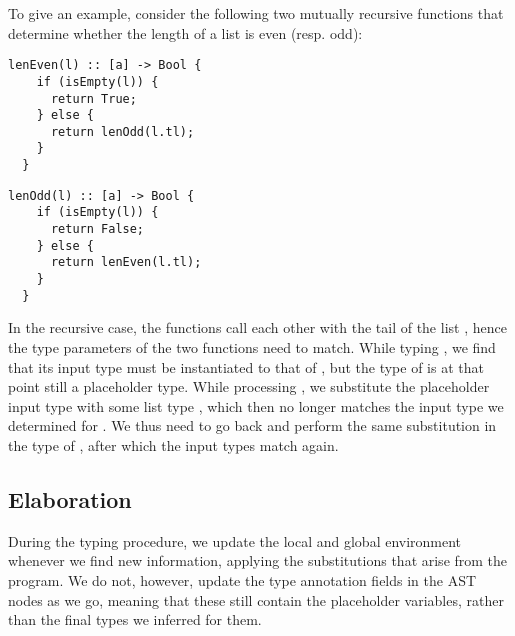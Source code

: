 To give an example, consider the following two mutually recursive functions that
determine whether the length of a list is even (resp. odd):

\begin{center}
\begin{minipage}{.4\textwidth}
  \centering
\begin{lstlisting}[language=SPL]
  lenEven(l) :: [a] -> Bool {
    if (isEmpty(l)) {
      return True;
    } else {
      return lenOdd(l.tl);
    }
  }
\end{lstlisting}
\end{minipage}\hspace{8mm}%
\begin{minipage}{.4\textwidth}
  \centering
\begin{lstlisting}[language=SPL]
  lenOdd(l) :: [a] -> Bool {
    if (isEmpty(l)) {
      return False;
    } else {
      return lenEven(l.tl);
    }
  }
\end{lstlisting}
\end{minipage}
\end{center}\vspace{2mm}

In the recursive case, the functions call each other with the tail of the list
, hence the type parameters of the two functions need to match.
While typing , we find that its input type must be instantiated to
that of , but the type of  is at that point still a
placeholder type.
While processing , we substitute the placeholder input type with
some list type \spl{[$\alpha$]}, which then no longer matches the input type we
determined for . We thus need to go back and perform the same
substitution in the type of , after which the input types match
again.


\subsection{Elaboration} \label{sec:elaboration}

During the typing procedure, we update the local and global environment whenever
we find new information, applying the substitutions that arise from the program.
We do not, however, update the type annotation fields in the AST nodes as we go,
meaning that these still contain the placeholder variables, rather than the
final types we inferred for them.

